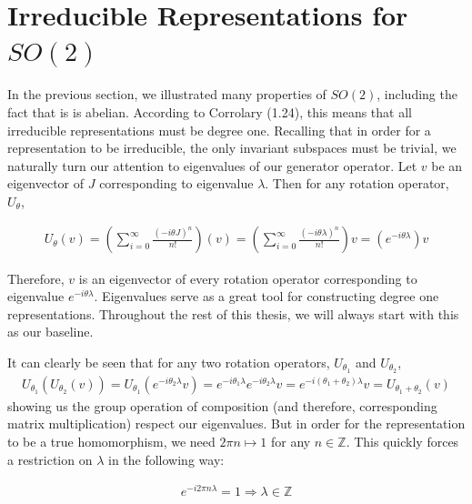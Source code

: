\documentclass[10pt]{ucthesis}
\newcommand{\Z}{\mathbb{Z}}
\begin{document}
\section{Irreducible Representations for $SO(2)$}

In the previous section, we illustrated many properties of $SO(2)$, including the fact that is is abelian. According to Corrolary (1.24), this means that all irreducible representations must be degree one. Recalling that in order for a representation to be irreducible, the only invariant subspaces must be trivial, we naturally turn our attention to eigenvalues of our generator operator. Let $v$ be an eigenvector of $J$ corresponding to eigenvalue $\lambda$. Then for any rotation operator, $U_\theta$,


\begin{equation}
	\begin{aligned}
		U_\theta (v) = \left(\sum_{i=0}^\infty \frac{(-i\theta J)^n}{n!}\right) (v) = \left(\sum_{i=0}^\infty \frac{(-i\theta \lambda)^n}{n!}\right)v = \left(e^{-i\theta \lambda}\right)v
	\end{aligned}
\end{equation}

Therefore, $v$ is an eigenvector of every rotation operator corresponding to eigenvalue $e^{-i\theta \lambda}$. Eigenvalues serve as a great tool for constructing degree one representations. Throughout the rest of this thesis, we will always start with this as our baseline.

It can clearly be seen that for any two rotation operators, $U_{\theta_1}$ and $U_{\theta_2}$,  
\begin{equation}
	\begin{aligned}
		U_{\theta_1}(U_{\theta_2}(v)) = U_{\theta_1}(e^{-i\theta_2 \lambda}v) = e^{-i\theta_1 \lambda}e^{-i\theta_2 \lambda}v = e^{-i(\theta_1 + \theta_2) \lambda}v = U_{\theta_1+\theta_2}(v) 
	\end{aligned}
\end{equation}
showing us the group operation of composition (and therefore, corresponding matrix multiplication) respect our eigenvalues. But in order for the representation to be a true homomorphism, we need $2\pi n \mapsto 1$ for any $n\in\Z$. This quickly forces a restriction on $\lambda$ in the following way:

\begin{equation}
	\begin{aligned}
		e^{-i2\pi n\lambda} = 1 \Rightarrow \lambda \in \Z
	\end{aligned}
\end{equation}
\end{document}
